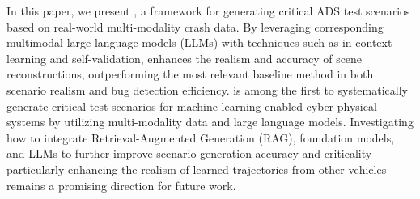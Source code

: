 In this paper, we present {\tool}, a framework for generating critical ADS test scenarios based on real-world multi-modality crash data. By leveraging corresponding multimodal large language models (LLMs) with techniques such as in-context learning and self-validation, {\tool} enhances the realism and accuracy of scene reconstructions, outperforming the most relevant baseline method in both scenario realism and bug detection efficiency. {\tool} is among the first to systematically generate critical test scenarios for machine learning-enabled cyber-physical systems by utilizing multi-modality data and large language models. Investigating how to integrate Retrieval-Augmented Generation (RAG), foundation models, and LLMs to further improve scenario generation accuracy and criticality—particularly enhancing the realism of learned trajectories from other vehicles—remains a promising direction for future work.
\vspace{-2mm}